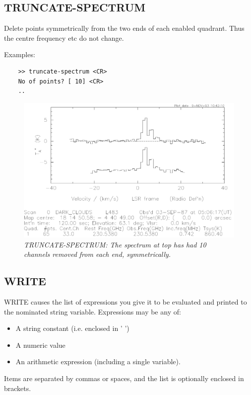\documentclass[11pt,twoside]{report}
\begin{document}
\subsection{TRUNCATE-SPECTRUM} 

Delete points symmetrically from the two ends of each enabled quadrant.
Thus the centre frequency etc do not change.

Examples:
\begin{verbatim}
    >> truncate-spectrum <CR>
    No of points? [ 10] <CR>
    ..
\end{verbatim}

\begin{figure}[htbp]
\begin{center}
\includegraphics[scale=0.65]{truncate}
\protect\parbox{5.5in}
{\caption[TRUNCATE]
{\sl
TRUNCATE-SPECTRUM: The spectrum at top has had 10 channels removed from
{\em each} end, symmetrically.
\label{TRUNCATE}
}
}
\end{center}
\end{figure}

\subsection{WRITE}

WRITE causes the list of expressions you give it to be evaluated and printed to
the nominated string variable. Expressions may be any of:
\begin{itemize}
\item    A string constant (i.e. enclosed in ' ')
\item    A numeric value
\item    An arithmetic expression (including a single variable).
\end{itemize}
Items are separated by commas or spaces, and the list is optionally enclosed
in brackets.
\end{document}
